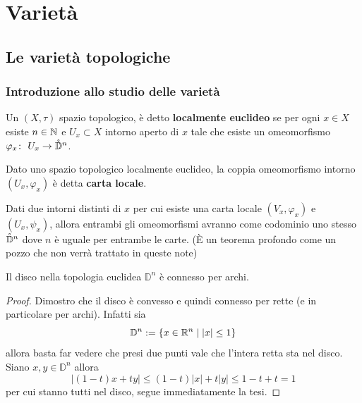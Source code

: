 \chapter{Varietà}


\newpage
\section{Le varietà topologiche}
\subsection{\textcolor{TopAlg}{\textbf{Introduzione allo studio delle varietà}}}

\begin{definition}
	Un $(X,\tau)$ spazio topologico, è detto \textbf{localmente euclideo} se per ogni $x \in X$ esiste $n \in \mathbb{N}$ e $U_x \subset X$ intorno aperto di $x$ tale che esiste un omeomorfismo $\varphi_x \colon\ U_x \rightarrow \mathring{\mathbb{D}}^n$.  
\end{definition}

\begin{definition}
	Dato uno spazio topologico localmente euclideo, la coppia omeomorfismo intorno $(U_x, \varphi_x)$ è detta \textbf{carta locale}.
\end{definition}

\begin{remark}
	Dati due intorni distinti di $x$ per cui esiste una carta locale $(V_x, \varphi_x)$ e $(U_x, \psi_x)$, allora entrambi gli omeomorfismi avranno come codominio uno stesso $\mathring{\mathbb{D}}^n$ dove $n$ è uguale per entrambe le carte. (È un teorema profondo come un pozzo che non verrà trattato in queste note)
\end{remark}

\begin{theorem}
	Il disco nella topologia euclidea $\mathbb{D}^n$ è connesso per archi. 
\end{theorem} 
\begin{proof}
	Dimostro che il disco è convesso e quindi connesso per rette (e in particolare per archi). Infatti sia 
	\begin{equation}
	\mathbb{D}^n := \{x\in \mathbb{R}^n\; |\; |x| \le 1\}
	\end{equation}
	allora basta far vedere che presi due punti vale che l'intera retta sta nel disco. Siano $x, y \in \mathbb{D}^n$ allora
	\begin{equation}
	|(1-t)x+ty| \le (1-t)|x| + t|y| \le 1-t+t =1
	\end{equation}
	per cui stanno tutti nel disco, segue immediatamente la tesi. 
\end{proof}

